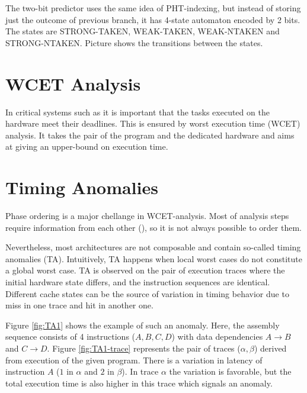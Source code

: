 The two-bit predictor uses the same idea of PHT-indexing, but instead of storing just the outcome of previous branch, it has 4-state automaton encoded by 2 bits. The states are STRONG-TAKEN, WEAK-TAKEN, WEAK-NTAKEN and STRONG-NTAKEN. Picture \TODO{} shows the transitions between the states.




\section{WCET Analysis}

In critical systems such as  it is important that the tasks executed on the hardware meet their deadlines. This is ensured by worst execution time (WCET) analysis. It takes the pair of the program and the dedicated hardware and aims at giving an upper-bound on execution time. 


\section{Timing Anomalies}

Phase ordering is a major chellange in WCET-analysis. Most of analysis steps require information from each other (), so it is not always possible to order them. 

Nevertheless, most architectures are not composable and contain so-called timing anomalies (TA). Intuitively, TA happens when local worst cases do not constitute a global worst case. TA is observed on the pair of execution traces where the initial hardware state differs, and the instruction sequences are identical. Different cache states can be the source of variation in timing behavior due to miss in one trace and hit in another one.

Figure \ref{fig:TA1} shows the example of such an anomaly. Here, the assembly sequence consists of 4 instructions ($A,B,C,D$) with data dependencies $A \rightarrow B$ and $C \rightarrow D$. Figure \ref{fig:TA1-trace} represents the pair of traces ($\alpha, \beta$) derived from execution of the given program. There is a variation in latency of instruction $A$ ($1$ in $\alpha$ and $2$ in $\beta$). In trace $\alpha$  the variation is favorable, but the total execution time is also higher in this trace which signals an anomaly.

